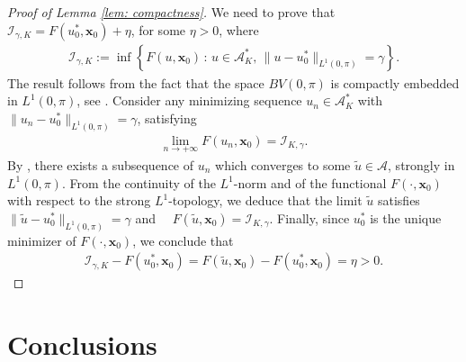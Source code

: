 \documentclass[twocolumn]{autart}    %
\begin{document}
\vspace{0.5em}
\begin{proof}[Proof of Lemma \ref{lem: compactness}]
We need to prove that $\mathcal{I}_{\gamma,K} = F(u_0^\ast, \bm{x}_0) + \eta$,	for some $\eta>0$, where
	\begin{align*}
		\mathcal{I}_{\gamma,K} :=  \inf \left\{ F(u, \bm{x}_0) \,: \, u\in \mathcal{A}_K^\ast,\, \|u- u_0^\ast \|_{L^1(0,\pi)} = \gamma \right\}.
	\end{align*}
	The result follows from the fact that the space $BV(0,\pi)$ is compactly embedded in $L^1 (0,\pi)$, see \cite[Theorem 3.23]{ambrosio2000functions}.
	Consider any minimizing sequence $u_n\in \mathcal{A}_K^\ast$ with $\| u_n - u^\ast_0\|_{L^1(0,\pi)} =\gamma$, satisfying
	\begin{align*}
		\lim_{n\to+\infty} F(u_n, \bm{x}_0) = \mathcal{I}_{K,\gamma}.
	\end{align*}
	By \cite[Theorem 3.23]{ambrosio2000functions}, there exists a subsequence of $u_n$ which converges to some $\tilde{u}\in \mathcal{A}$, strongly in $L^1(0,\pi)$. From the continuity of the $L^1$-norm and of the functional $F(\cdot, \bm{x}_0)$ with respect to the strong $L^1$-topology, we deduce that the limit $\tilde{u}$ satisfies $\| \tilde{u} - u_0^\ast \|_{L^1(0,\pi)} = \gamma$ and $\quad F(\tilde{u}, \bm{x}_0) = \mathcal{I}_{K,\gamma}$. Finally, since $u_0^\ast$ is the unique minimizer of $F(\cdot, \bm{x}_0)$, we conclude that
	\begin{align*}
		\mathcal{I}_{\gamma, K} - F(u_0^\ast, \bm{x}_0) = F(\tilde{u}, \bm{x}_0) - F(u_0^\ast, \bm{x}_0) = \eta >0. 
	\end{align*}
\end{proof}

\section{Conclusions}\label{sec:conclusions}
\end{document}
